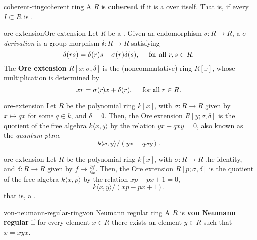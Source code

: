 \begin{topic}{coherent-ring}{coherent ring}
    A  $R$ is \textbf{coherent} if it is a  over itself. That is, if every   $I \subset R$ is .
\end{topic}

\begin{topic}{ore-extension}{Ore extension}
    Let $R$ be a . Given an endomorphism $\sigma : R \to R$, a \textit{$\sigma$-derivation} is a group morphism $\delta : R \to R$ satisfying
    \[ \delta(rs) = \delta(r) s + \sigma(r) \delta(s) , \quad \textup { for all } r, s \in R . \]
    The \textbf{Ore extension} $R[x; \sigma, \delta]$ is the (noncommutative) ring $R[x]$, whose multiplication is determined by
    \[ xr = \sigma(r) x + \delta(r), \quad \textup{ for all } r \in R . \]
\end{topic}

\begin{example}{ore-extension}
    Let $R$ be the polynomial ring $k[x]$, with $\sigma : R \to R$ given by $x \mapsto qx$ for some $q \in k$, and $\delta = 0$. Then, the Ore extension $R[y; \sigma, \delta]$ is the quotient of the free algebra $k \langle x, y \rangle$ by the relation $yx - qxy = 0$, also known as the \textit{quantum plane}
    \[ k \langle x, y \rangle / (yx - qxy) . \]
\end{example}

\begin{example}{ore-extension}
    Let $R$ be the polynomial ring $k[x]$, with $\sigma : R \to R$ the identity, and $\delta : R \to R$ given by $f \mapsto \frac{\partial f}{\partial x}$. Then, the Ore extension $R[p; \sigma, \delta]$ is the quotient of the free algebra $k \langle x, p \rangle$ by the relation $xp - px + 1 = 0$,
    \[ k \langle x, y \rangle / (xp - px + 1) . \]
    that is, a .
\end{example}

\begin{topic}{von-neumann-regular-ring}{von Neumann regular ring}
    A  $R$ is \textbf{von Neumann regular} if for every element $x \in R$ there exists an element $y \in R$ such that $x = xyx$.
\end{topic}

